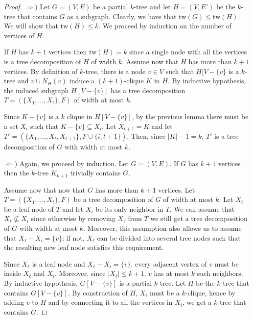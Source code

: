 \documentclass[12pt,a4paper]{article}
\newcommand{\abs}[1]{\left|#1\right|}
\begin{document}
	\begin{proof}
		$\Rightarrow)$ Let $G = (V,E)$ be a partial $k$-tree and let $H = (V,E')$ be the $k$-tree that contains $G$ as a subgraph. Clearly, we have that $\mathrm{tw}(G) \leq \mathrm{tw}(H)$. We will show that $\mathrm{tw}(H) \leq k$. We proceed by induction on the number of vertices of $H$.
		
		If $H$ has $k+1$ vertices then $\mathrm{tw}(H) = k$ since a single node with all the vertices is a tree decomposition of $H$ of width $k$. Assume now that $H$ has more than $k+1$ vertices. By definition of $k$-tree, there is a node $v \in V$ such that $H[V-\{v\}$ is a $k$-tree and $v \cup N_H(v)$ induce a $(k+1)$-clique $K$ in $H$. By inductive hypothesis, the induced subgraph $H[V-\{v\}]$ has a tree decomposition $T = (\{X_1, \ldots, X_t\},F)$ of width at most $k$.
		
		Since $K-\{v\}$ is a $k$ clique in $H[V-\{v\}]$, by the previous lemma there must be a set $X_i$ such that $K-\{v\} \subseteq X_i$. Let $X_{t+1} = K$ and let $T' = (\{X_1, \ldots, X_t, X_{t+1}\}, F \cup \{i,t+1\})$. Then, since $\abs{K}-1 = k$, $T'$ is a tree decomposition of $G$ with width at most $k$.

		$\Leftarrow)$ Again, we proceed by induction. Let $G = (V,E)$. If $G$ has $k+1$ vertices then the $k$-tree $K_{k+1}$ trivially contains $G$.
		
		Assume now that now that $G$ has more than $k+1$ vertices. Let $T = (\{X_1, \ldots, X_t\},F)$ be a tree decomposition of $G$ of width at most $k$. Let $X_\ell$ be a leaf node of $T$ and let $X_i$ be its only neighbor in $T$. We can assume that $X_\ell \not\subseteq X_i$ since otherwise by removing $X_\ell$ from $T$ we still get a tree decomposition of $G$ with width at most $k$. Moreover, this assumption also allows us to assume that $X_\ell - X_i = \{v\}$: if not, $X_\ell$ can be divided into several tree nodes such that the resulting new leaf node satisfies this requirement.

		Since $X_\ell$ is a leaf node and $X_\ell - X_i = \{v\}$, every adjacent vertex of $v$ must be inside $X_\ell$ and $X_i$. Moreover, since $\abs{X_\ell} \leq k+1$, $v$ has at most $k$ such neighbors. By inductive hypothesis, $G[V-\{v\}]$ is a partial $k$ tree. Let $H$ be the $k$-tree that contains $G[V-\{v\}]$. By construction of $H$, $X_i$ must be a $k$-clique, hence by adding $v$ to $H$ and by connecting it to all the vertices in $X_i$, we get a $k$-tree that contains $G$.
	\end{proof}
\end{document}
